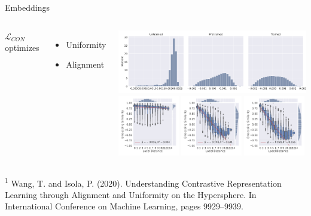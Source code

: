 \documentclass[aspectratio=169,onlytextwidth]{beamer}
\begin{document}
\begin{frame}{Embeddings}
  \begin{columns}[T]
      $\mathcal{L}_{CON}$ optimizes \footnotemark[1]
      \begin{itemize}
        \item Uniformity
        \item Alignment
      \end{itemize}

      \vspace{-1.9cm}
      \includegraphics[width=\textwidth]{uniformity}
      \includegraphics[width=0.32\textwidth]{label_embedding_untrained}
      \includegraphics[width=0.32\textwidth]{label_embedding_pretrained}
      \includegraphics[width=0.32\textwidth]{label_embedding_trained}
  \end{columns}

  \vfill
  \footnoterule \tiny
  \begin{minipage}[b]{\textwidth}
    \textsuperscript{1} Wang, T. and Isola, P. (2020). Understanding Contrastive Representation Learning through Alignment and Uniformity on the Hypersphere. In International Conference on Machine Learning, pages 9929–9939.
  \end{minipage}
\end{frame}
\end{document}
